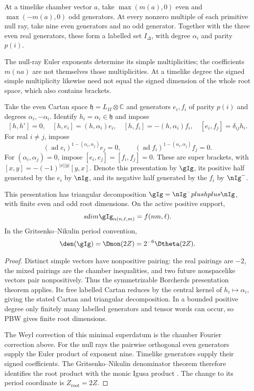 \begin{definition}
At a timelike chamber vector \(a\), take
\(\max(m(a),0)\) even and \(\max(-m(a),0)\) odd generators.
At every nonzero multiple of each primitive null ray, take nine
even generators and no odd generator. Together with the three
even real generators, these form a labelled set \(I_\Delta\),
with degree \(\alpha_i\) and parity \(p(i)\).
\end{definition}

The null-ray Euler exponents determine its simple multiplicities;
the coefficients \(m(na)\) are not themselves those multiplicities.
At a timelike degree the signed simple multiplicity likewise need
not equal the signed dimension of the whole root space, which also
contains brackets.

\begin{definition}
Take the even Cartan space \(\mathfrak h=L_{II}\otimes\mathbb C\)
and generators \(e_i,f_i\) of parity \(p(i)\) and degrees
\(\alpha_i,-\alpha_i\). Identify \(h_i=\alpha_i\in\mathfrak h\)
and impose
\[
 [h,h']=0,\quad [h,e_i]=(h,\alpha_i)e_i,\quad
 [h,f_i]=-(h,\alpha_i)f_i,\quad [e_i,f_j]=\delta_{ij}h_i.
\]
For real \(i\ne j\), impose
\[
 (\operatorname{ad}e_i)^{1-(\alpha_i,\alpha_j)}e_j=0,
 \qquad(\operatorname{ad}f_i)^{1-(\alpha_i,\alpha_j)}f_j=0.
\]
For \((\alpha_i,\alpha_j)=0\), impose
\([e_i,e_j]=[f_i,f_j]=0\). These are super brackets, with
\([x,y]=-(-1)^{|x||y|}[y,x]\). Denote this presentation by
\(\gIg\), its positive half generated by the $e_i$ by \(\nIg\),
and its negative half generated by the $f_i$ by \(\nIg^-\).
\end{definition}

\begin{theorem}
This presentation has triangular decomposition
\(\gIg=\nIg^-\oplus\mathfrak h\oplus\nIg\), with finite
even and odd root dimensions. On the active positive support,
\[
 \operatorname{sdim}\gIg_{\alpha(n,\ell,m)}=f(nm,\ell).
\]
In the Gritsenko--Nikulin period convention,
\[
 \den(\gIg)=\Dmon(2Z)=2^{-6}\Dtheta(2Z).
\]
\end{theorem}
\begin{proof}
Distinct simple vectors have nonpositive pairing: the real pairings
are \(-2\), the mixed pairings are the chamber inequalities,
and two future nonspacelike vectors pair nonpositively. Thus the
symmetrizable Borcherds presentation theorem applies. Its free
labelled Cartan reduces by the central kernel of
\(h_i\mapsto\alpha_i\), giving the stated Cartan and triangular
decomposition. In a bounded positive degree only finitely many
labelled generators and tensor words can occur, so PBW gives finite
root dimensions.

The Weyl correction of this minimal superdatum is the chamber
Fourier correction above. For the null rays the pairwise orthogonal
even generators supply the Euler product of exponent nine. Timelike
generators supply their signed coefficients. The Gritsenko--Nikulin
denominator theorem therefore identifies the root product with the
monic Igusa product \cite{GN97,GN98a,GN98b}. The change to its
period coordinate is \(Z_{\mathrm{root}}=2Z\).
\end{proof}

